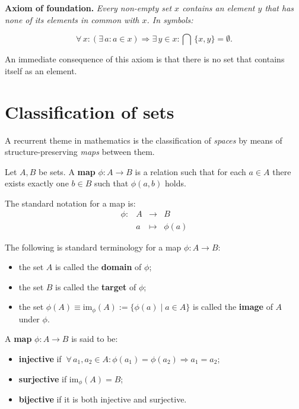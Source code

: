 \documentclass[root.tex]{subfiles}
\begin{document}
\textbf{Axiom of foundation.} \emph{Every non-empty set $x$ contains an element $y$ that has none of its elements in common with $x$. In symbols:}

$$
\forall \, x : (\exists \,a : a \in x) \Rightarrow \exists \, y \in x : \bigcap \, \{x,y\} = \emptyset .
$$

An immediate consequence of this axiom is that there is no set that contains itself as an element.\\



\section{Classification of sets}

A recurrent theme in mathematics is the classification of \emph{spaces} by means of structure-preserving \emph{maps} between them. 

\begin{mydef}
  Let $A,B$ be sets. A \textbf{map} $\phi : A \to B$ is a relation such that for each $a \in A$ there exists exactly one $b \in B$ such that $\phi(a,b)$ holds.
\end{mydef}
The standard notation for a map is:
\begin{equation}
\begin{aligned}
\phi :& A   & \to     & B\\
      & a   & \mapsto & \phi(a)
\end{aligned}
\end{equation}

The following is standard terminology for a map $\phi : A \to B$:
\begin{itemize}
  \item the set $A$ is called the \textbf{domain} of $\phi$;
\item the set $B$ is called the \textbf{target} of $\phi$;
\item the set $\phi(A) \equiv \text{im}_\phi(A) := \{\phi(a) \mid a \in A\}$ is called the \textbf{image} of $A$ under $\phi$.
\end{itemize}

\begin{mydef}
A \textbf{map} $\phi : A \to B$ is said to be:
\begin{itemize}
  \item \textbf{injective} if $\ \forall \, a_1,a_2 \in A : \phi(a_1)=\phi(a_2) \Rightarrow a_1 = a_2$;
\item \textbf{surjective} if $\text{im}_\phi(A) = B$;
\item \textbf{bijective} if it is both injective and surjective.
\end{itemize}
\end{mydef}
\end{document}
